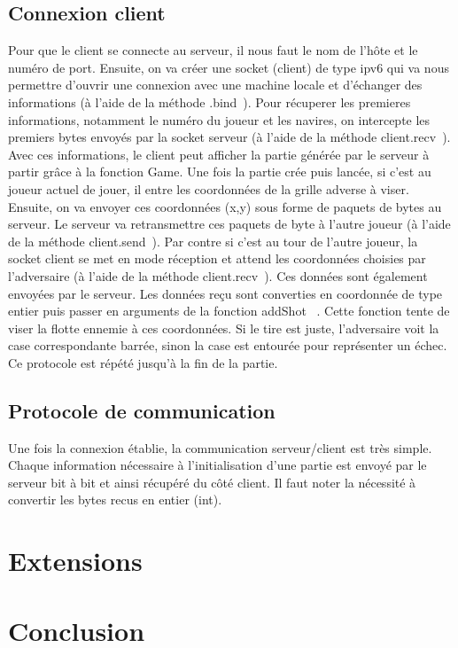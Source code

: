 \documentclass{article}
\begin{document}
	\subsection{Connexion client}
	Pour que le client se connecte au serveur, il nous faut le nom de l'h\^ote et le num\'ero de port.
	\newline Ensuite, on va cr\'eer une socket (client) de type ipv6 qui va nous permettre d'ouvrir une connexion avec une machine locale et d'\'echanger des informations (\`a l'aide de la m\'ethode  \guillemotleft .bind\guillemotright\ ).
	\newline Pour r\'ecuperer les premieres informations, notamment le num\'ero du joueur et les navires, on intercepte les premiers bytes envoy\'es par la socket serveur (\`a l'aide de la m\'ethode \guillemotleft client.recv\guillemotright\ ).
	\newline Avec ces informations, le client peut afficher la partie g\'en\'er\'ee par le serveur \`a partir gr\^ace \`a la fonction Game.
	\newline Une fois la partie cr\'ee puis lanc\'ee, si c'est au joueur actuel de jouer, il entre les coordonn\'ees de la grille adverse \`a viser. Ensuite, on va envoyer ces coordonn\'ees (x,y) sous forme de paquets de bytes au serveur. Le serveur va retransmettre ces paquets de byte \`a l'autre joueur (\`a l'aide de la m\'ethode \guillemotleft client.send\guillemotright\ ).
	\newline Par contre si c'est au tour de l'autre joueur, la socket client se met en mode r\'eception et attend les coordonn\'ees choisies par l'adversaire (\`a l'aide de la m\'ethode \guillemotleft client.recv\guillemotright\ ). Ces donn\'ees sont \'egalement envoy\'ees par le serveur. 
	\newline Les donn\'ees re\c cu sont converties en coordonn\'ee de type entier puis passer en arguments de la fonction \guillemotleft addShot \guillemotright\ . Cette fonction tente de viser la flotte ennemie \`a ces coordonn\'ees. Si le tire est juste, l'adversaire voit la case correspondante barr\'ee, sinon la case est entour\'ee pour repr\'esenter un \'echec.    
	\newline Ce protocole est r\'ep\'et\'e jusqu'\`a la fin de la partie.

	\subsection{Protocole de communication}
	Une fois la connexion \'etablie, la communication serveur/client est tr\`es simple.
	Chaque information n\'ecessaire \`a l'initialisation d'une partie est envoy\'e par le serveur bit \`a bit et ainsi r\'ecup\'er\'e du c\^ot\'e client.
	Il faut noter la n\'ecessit\'e \`a convertir les bytes recus en entier (int).

\section{Extensions}

\section{Conclusion}
\end{document}
